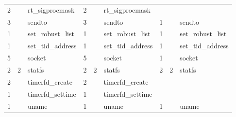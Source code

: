 \documentclass[submit,techreq,noauthor]{eco}	%
\begin{document}
\begin{table}[t]
\begin{tabular}{|lllllllll|}
  \multicolumn{1}{|l|}{2}     & \multicolumn{1}{l|}{}       & \multicolumn{1}{l|}{rt\_sigprocmask}   & \multicolumn{1}{l|}{2}     & \multicolumn{1}{l|}{}       & \multicolumn{1}{l|}{rt\_sigprocmask}   & \multicolumn{1}{l|}{}      & \multicolumn{1}{l|}{}       &                   \\
  \multicolumn{1}{|l|}{3}     & \multicolumn{1}{l|}{}       & \multicolumn{1}{l|}{sendto}            & \multicolumn{1}{l|}{3}     & \multicolumn{1}{l|}{}       & \multicolumn{1}{l|}{sendto}            & \multicolumn{1}{l|}{1}     & \multicolumn{1}{l|}{}       & sendto            \\
  \multicolumn{1}{|l|}{1}     & \multicolumn{1}{l|}{}       & \multicolumn{1}{l|}{set\_robust\_list} & \multicolumn{1}{l|}{1}     & \multicolumn{1}{l|}{}       & \multicolumn{1}{l|}{set\_robust\_list} & \multicolumn{1}{l|}{1}     & \multicolumn{1}{l|}{}       & set\_robust\_list \\
  \multicolumn{1}{|l|}{1}     & \multicolumn{1}{l|}{}       & \multicolumn{1}{l|}{set\_tid\_address} & \multicolumn{1}{l|}{1}     & \multicolumn{1}{l|}{}       & \multicolumn{1}{l|}{set\_tid\_address} & \multicolumn{1}{l|}{1}     & \multicolumn{1}{l|}{}       & set\_tid\_address \\
  \multicolumn{1}{|l|}{5}     & \multicolumn{1}{l|}{}       & \multicolumn{1}{l|}{socket}            & \multicolumn{1}{l|}{5}     & \multicolumn{1}{l|}{}       & \multicolumn{1}{l|}{socket}            & \multicolumn{1}{l|}{1}     & \multicolumn{1}{l|}{}       & socket            \\
  \multicolumn{1}{|l|}{2}     & \multicolumn{1}{l|}{2}      & \multicolumn{1}{l|}{statfs}            & \multicolumn{1}{l|}{2}     & \multicolumn{1}{l|}{2}      & \multicolumn{1}{l|}{statfs}            & \multicolumn{1}{l|}{2}     & \multicolumn{1}{l|}{2}      & statfs            \\
  \multicolumn{1}{|l|}{2}     & \multicolumn{1}{l|}{}       & \multicolumn{1}{l|}{timerfd\_create}   & \multicolumn{1}{l|}{2}     & \multicolumn{1}{l|}{}       & \multicolumn{1}{l|}{timerfd\_create}   & \multicolumn{1}{l|}{}      & \multicolumn{1}{l|}{}       &                   \\
  \multicolumn{1}{|l|}{1}     & \multicolumn{1}{l|}{}       & \multicolumn{1}{l|}{timerfd\_settime}  & \multicolumn{1}{l|}{1}     & \multicolumn{1}{l|}{}       & \multicolumn{1}{l|}{timerfd\_settime}  & \multicolumn{1}{l|}{}      & \multicolumn{1}{l|}{}       &                   \\
  \multicolumn{1}{|l|}{1}     & \multicolumn{1}{l|}{}       & \multicolumn{1}{l|}{uname}             & \multicolumn{1}{l|}{1}     & \multicolumn{1}{l|}{}       & \multicolumn{1}{l|}{uname}             & \multicolumn{1}{l|}{1}     & \multicolumn{1}{l|}{}       & uname             \\

\end{tabular}
\end{table}
\end{document}

